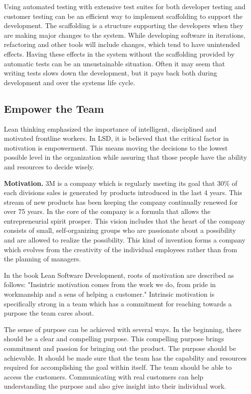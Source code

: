 Using automated testing with extensive test suites for both developer testing and customer testing can be an efficient way to implement scaffolding to support the development. The scaffolding is a structure supporting the developers when they are making major changes to the system. While developing software in iterations, refactoring and other tools will include changes, which tend to have unintended effects. Having these effects in the system without the scaffolding provided by automatic tests can be an unsustainable situation. Often it may seem that writing tests slows down the development, but it pays back both during development and over the systems life cycle.

\subsection{Empower the Team}

Lean thinking emphasized the importance of intelligent, disciplined and motivated frontline workers. In LSD, it is believed that the critical factor in motivation is empowerment. This means moving the decisions to the lowest possible level in the organization while assuring that those people have the ability and resources to decide wisely.


\textbf{Motivation.} 3M is a company which is regularly meeting its goal that 30\% of each divisions sales is generated by products introduced in the last 4 years. This stream of new products has been keeping the company continually renewed for over 75 years. In the core of the company is a formula that allows the entrepreneurial spirit prosper. This vision includes that the heart of the company consists of small, self-organizing groups who are passionate about a possibility and are allowed to realize the possibility. This kind of invention forms a company which evolves from the creativity of the individual employees rather than from the planning of managers.

In the book Lean Software Development, roots of motivation are described as follows: "Insintric motivation comes from the work we do, from pride in workmanship and a sens of helping a customer." Intrinsic motivation is specifically strong in a team which has a commitment for reaching towards a purpose the team cares about. 

The sense of purpose can be achieved with several ways. In the beginning, there should be a clear and compelling purpose. This compelling purpose brings commitment and passion for bringing out the product. The purpose should be achievable. It should be made sure that the team has the capability and resources required for accomplishing the goal within itself. The team should be able to access the customers. Communicating with real customers can help understanding the purpose and also give insight into their individual work.

